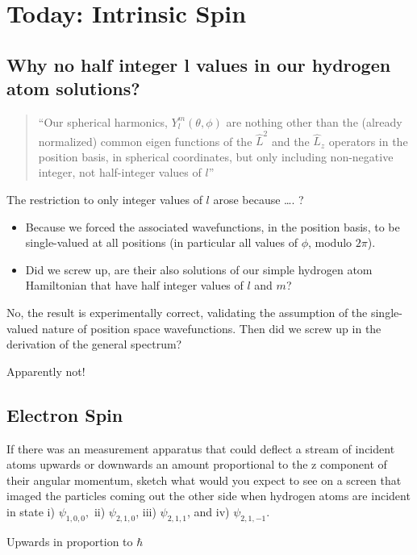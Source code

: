 \documentclass{article}
\begin{document}
\section{Today: Intrinsic Spin}

\subsection{Why no half integer l values in our hydrogen atom solutions?}

\begin{quote}
    “Our spherical harmonics, $Y_l^m (\theta, \phi)$ are nothing other than the (already normalized) common eigen functions of the  $\hat{L}^2$ and the $\hat{L}_z$ operators in the position basis, in spherical coordinates, but only including non-negative integer, not half-integer values of $l$” 
\end{quote}

The restriction to only integer values of $l$ arose because …. ?

\begin{itemize}
    \item Because we forced the associated wavefunctions, in the position basis, to be single-valued at all positions (in particular all values of $\phi$, modulo $2 \pi$). 
    \item Did we screw up, are their also solutions of our simple hydrogen atom Hamiltonian that have half integer values of $l$ and $m$?
\end{itemize}

No, the result is experimentally correct, validating the assumption of the single-valued nature of position space wavefunctions.  Then did we screw up in the derivation of the general spectrum?

Apparently not!

\subsection{Electron Spin}

If there was an measurement apparatus that could deflect a stream of incident atoms upwards or downwards an amount proportional to the z component of their angular momentum, sketch what would you expect to see on a screen that imaged the particles coming out the other side when hydrogen atoms are incident in state i) $\psi_{1,0,0},$ ii) $\psi_{2,1,0}$, iii) $\psi_{2,1,1}$, and iv) $\psi_{2,1,-1}$. 

Upwards in proportion to $\hbar$
\end{document}
